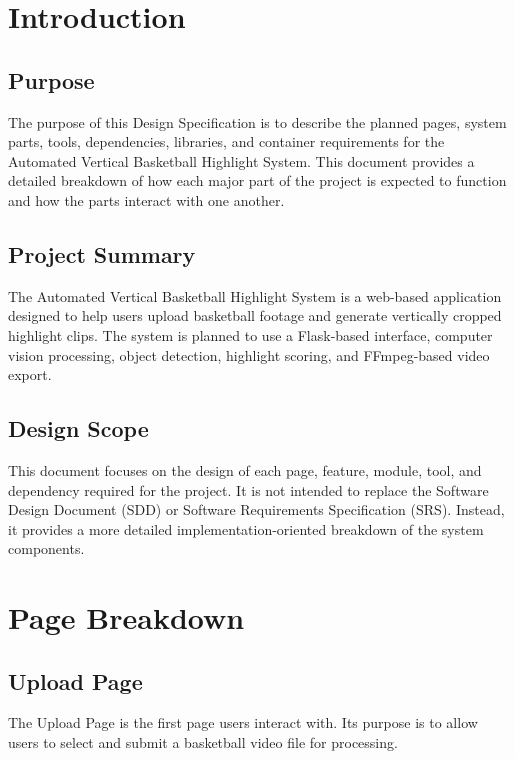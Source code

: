 \documentclass[12pt]{article}
\begin{document}
\newpage

\section{Introduction}

\subsection{Purpose}
The purpose of this Design Specification is to describe the planned pages, system parts, tools, dependencies, libraries, and container requirements for the Automated Vertical Basketball Highlight System. This document provides a detailed breakdown of how each major part of the project is expected to function and how the parts interact with one another.

\subsection{Project Summary}
The Automated Vertical Basketball Highlight System is a web-based application designed to help users upload basketball footage and generate vertically cropped highlight clips. The system is planned to use a Flask-based interface, computer vision processing, object detection, highlight scoring, and FFmpeg-based video export.

\subsection{Design Scope}
This document focuses on the design of each page, feature, module, tool, and dependency required for the project. It is not intended to replace the Software Design Document (SDD) or Software Requirements Specification (SRS). Instead, it provides a more detailed implementation-oriented breakdown of the system components.

\section{Page Breakdown}

\subsection{Upload Page}
The Upload Page is the first page users interact with. Its purpose is to allow users to select and submit a basketball video file for processing.
\end{document}
